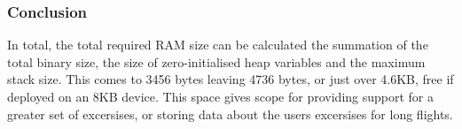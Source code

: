 \subsubsection{Conclusion}

In total, the total required RAM size can be calculated the summation of the total binary size, the size of zero-initialised heap variables and the maximum stack size. This comes to 3456 bytes leaving 4736 bytes, or just over 4.6KB, free if deployed on an 8KB device. This space gives scope for providing support for a greater set of excersises, or storing data about the users excersises for long flights.